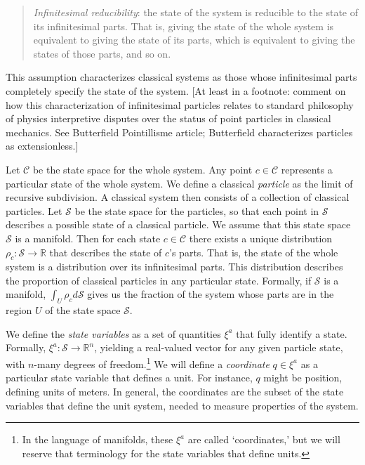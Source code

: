 \documentclass[letterpaper]{article}
\begin{document}
\begin{quotation}
\noindent
\textit{Infinitesimal reducibility}: the state of the system is reducible to the state of its infinitesimal parts. That is, giving the state of the whole system is equivalent to giving the state of its parts, which is equivalent to giving the states of those parts, and so on.
\end{quotation}

\noindent
This assumption characterizes classical systems as those whose infinitesimal parts completely specify the state of the system. [At least in a footnote: comment on how this characterization of infinitesimal particles relates to standard philosophy of physics interpretive disputes over the status of point particles in classical mechanics. See Butterfield Pointillisme article; Butterfield characterizes particles as extensionless.]

Let $\mathcal{C}$ be the state space for the whole system. Any point $c \in \mathcal{C}$ represents a particular state of the whole system. We define a classical \textit{particle} as the limit of recursive subdivision. A classical system then consists of a collection of classical particles. Let $\mathcal{S}$ be the state space for the particles, so that each point in $\mathcal{S}$ describes a possible state of a classical particle. We assume that this state space $\mathcal{S}$ is a manifold. Then for each state $c \in \mathcal{C}$ there exists a unique distribution $\rho_c : \mathcal{S} \to \mathbb{R} $ that describes the state of $c$'s parts. That is, the state of the whole system is a distribution over its infinitesimal parts. This distribution describes the proportion of classical particles in any particular state. Formally, if $\mathcal{S}$ is a manifold, $\int_U \rho_c d\mathcal{S}$ gives us the fraction of the system whose parts are in the region $U$ of the state space $\mathcal{S}$. 

We define the \textit{state variables} as a set of quantities $\xi^a$ that fully identify a state. Formally, $\xi^a: \mathcal{S} \to \mathbb{R}^n$, yielding a real-valued vector for any given particle state, with $n$-many degrees of freedom.\footnote{In the language of manifolds, these $\xi^a$ are called `coordinates,' but we will reserve that terminology for the state variables that define units.} We will define a \textit{coordinate} $q \in \xi^a$ as a particular state variable that defines a unit.  For instance, $q$ might be position, defining units of meters. In general, the coordinates are the subset of the state variables that define the unit system, needed to measure properties of the system. 
\end{document}
